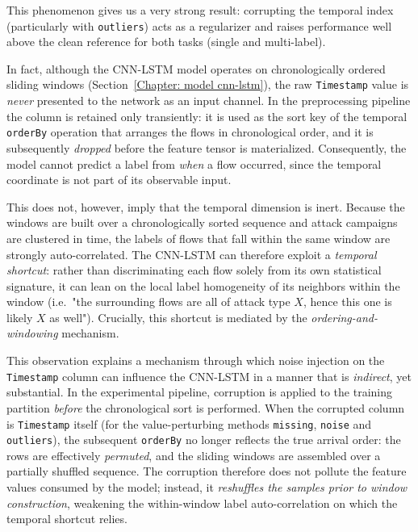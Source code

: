 \documentclass[../main.tex]{subfiles}
\begin{document}
This phenomenon gives us a very strong result: corrupting the temporal index (particularly with \texttt{outliers}) acts as a regularizer and raises performance well above the clean reference for both tasks (single and multi-label).

In fact, although the CNN-LSTM model operates on chronologically ordered sliding windows (Section~\ref{Chapter: model cnn-lstm}), the raw \texttt{Timestamp} value is \emph{never} presented to the network as an input channel. In the preprocessing pipeline the column is retained only transiently: it is used as the sort key of the temporal \texttt{orderBy} operation that arranges the flows in chronological order, and it is subsequently \emph{dropped} before the feature tensor is materialized. Consequently, the model cannot predict a label from \emph{when} a flow occurred, since the temporal coordinate is not part of its observable input.

This does not, however, imply that the temporal dimension is inert. Because the windows are built over a chronologically sorted sequence and attack campaigns are clustered in time, the labels of flows that fall within the same window are strongly auto-correlated. The CNN-LSTM can therefore exploit a \emph{temporal shortcut}: rather than discriminating each flow solely from its own statistical signature, it can lean on
the local label homogeneity of its neighbors within the window (i.e.\ "the surrounding flows are all of attack type $X$, hence this one is likely $X$ as well"). Crucially, this shortcut is mediated by the \emph{ordering-and-windowing} mechanism.

This observation explains a mechanism through which noise injection on the \texttt{Timestamp} column can influence the CNN-LSTM in a manner that is \emph{indirect}, yet substantial. In the experimental pipeline, corruption is applied to the training partition \emph{before} the chronological sort is performed. When the corrupted column is \texttt{Timestamp} itself (for the value-perturbing methods \texttt{missing}, \texttt{noise} and \texttt{outliers}), the subsequent \texttt{orderBy} no longer reflects the true arrival order: the rows are effectively \emph{permuted}, and the sliding windows are assembled over a partially shuffled sequence. The corruption
therefore does not pollute the feature values consumed by the model; instead, it \emph{reshuffles the samples prior to window construction}, weakening the within-window label auto-correlation on which the temporal shortcut relies.
\end{document}

